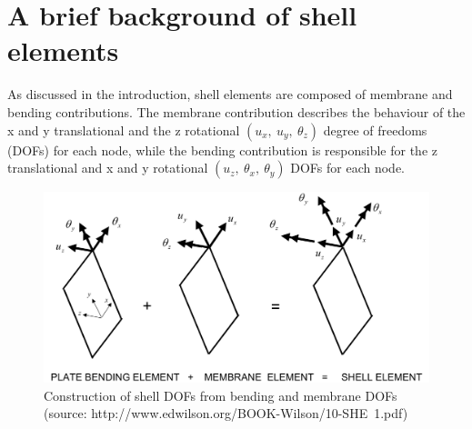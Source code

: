


\renewcommand{\Thema}{ANDES-DKT quadrilateral shell element}

\setcounter{MaxMatrixCols}{20}


\chapter{A brief background of shell elements}

As discussed in the introduction, shell elements are composed of membrane and bending contributions. The membrane contribution describes the behaviour of the x and y translational and the z rotational $(u_{x},\ u_{y},\ \theta_{z})$ degree of freedoms (DOFs) for each node, while the bending contribution is responsible for the z translational and x and y rotational $(u_{z},\ \theta_{x},\ \theta_{y})$ DOFs for each node.

\begin{figure}[H]
	\centering
	\def\svgwidth{\columnwidth}
	\includegraphics[width=12cm]{images/bendplusmemequalshell.png}
	\caption{Construction of shell DOFs from bending and membrane DOFs \\ (source: http://www.edwilson.org/BOOK-Wilson/10-SHE~1.pdf)}
	\label{bendplusmemequalshell}
\end{figure}

